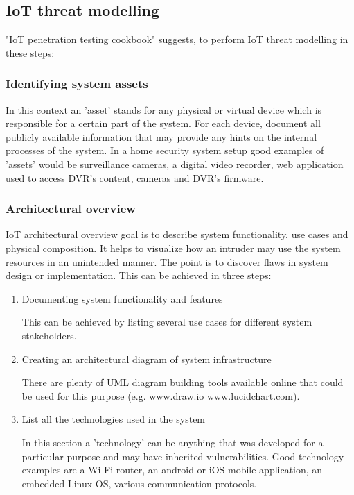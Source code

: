\subsection{IoT threat modelling}
"IoT penetration testing cookbook"\cite{cookbook} suggests, to perform IoT threat modelling in these steps:

\subsubsection{Identifying system assets}

In this context an 'asset' stands for any physical or virtual device which is responsible for a certain part of the system. For each device, document all publicly available information that may provide any hints on the internal processes of the system. \newline
In a home security system setup good examples of 'assets' would be surveillance cameras, a digital video recorder, web application used to access DVR's content, cameras and DVR’s firmware. 

\subsubsection{Architectural overview}

IoT architectural overview goal is to describe system functionality, use cases and physical composition. It helps to visualize how an intruder may use the system resources in an unintended manner. The point is to discover flaws in system design or implementation. This can be achieved in three steps:

\begin{enumerate}
	\item Documenting system functionality and features
	
	This can be achieved by listing several use cases for different system stakeholders. 
	
	\item Creating an architectural diagram of system infrastructure
	
	There are plenty of UML diagram building tools available online that could be used for this purpose (e.g. www.draw.io www.lucidchart.com). 
	
	\item List all the technologies used in the system
	
	In this section a 'technology' can be anything that was developed for a particular purpose and may have inherited vulnerabilities. \newline
	Good technology examples are a Wi-Fi router, an android or iOS mobile application, an embedded Linux OS, various communication protocols.
\end{enumerate}


